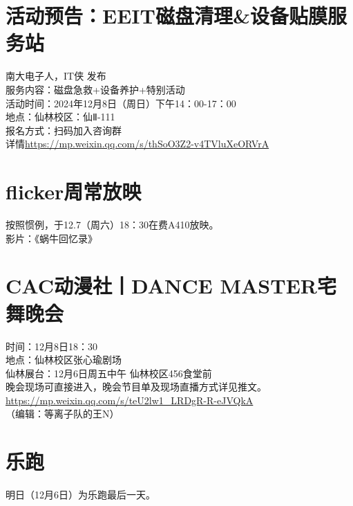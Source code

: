 \documentclass[letterpaper, 12pt]{article}
\begin{document}
\begin{multicols}{2}
\section{活动预告：EEIT磁盘清理\&设备贴膜服务站}
南大电子人，IT侠 发布\\
服务内容：磁盘急救+设备养护+特别活动\\
活动时间：2024年12月8日（周日）下午14：00-17：00\\
地点：仙林校区：仙Ⅱ-111\\
报名方式：扫码加入咨询群\\
详情\url{https://mp.weixin.qq.com/s/thSoO3Z2-v4TVluXeORVrA}

\section{flicker周常放映}
按照惯例，于12.7（周六）18：30在费A410放映。\\
影片：《蜗牛回忆录》
\section{CAC动漫社丨DANCE MASTER宅舞晚会}
时间：12月8日18：30\\
地点：仙林校区张心瑜剧场\\
仙林展台：12月6日周五中午 仙林校区456食堂前\\
晚会现场可直接进入，晚会节目单及现场直播方式详见推文。\\
\url{https://mp.weixin.qq.com/s/teU2lw1_LRDgR-R-eJVQkA}\\
（编辑：等离子队的王N）
\section{乐跑}
明日（12月6日）为乐跑最后一天。

\end{multicols}
\end{document}
